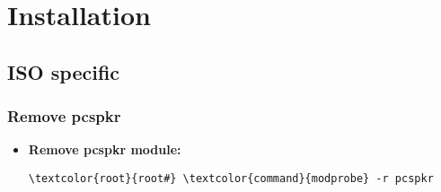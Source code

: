 \documentclass[10pt, a4paper, onecolumn, openany]{book} %
\begin{document}
\chapter{Installation}
\section{ISO specific}
\subsection{Remove pcspkr}
\begin{itemize}
    \item \textbf{Remove pcspkr module:}
\begin{Verbatim}[commandchars=\\\{\}]
\textcolor{root}{root#} \textcolor{command}{modprobe} -r pcspkr
\end{Verbatim}
\end{itemize}
\end{document}
